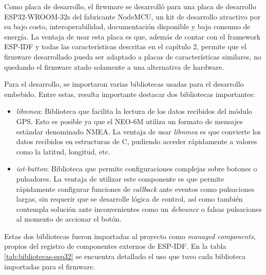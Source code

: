 Como placa de desarrollo, el firwmare se desarrolló para una placa de desarrollo ESP32-WROOM-32s del fabricante NodeMCU, un kit de desarrollo atractivo por su bajo costo, interoperabilidad, documentación disponible y bajo consumo de energía. La ventaja de usar esta placa es que, además de contar con el framework ESP-IDF y todas las características descritas en el capítulo 2, permite que el firmware desarrollado pueda ser adaptado a placas de características similares, no quedando el firmware atado solamente a una alternativa de hardware.

Para el desarrollo, se importaron varias bibliotecas usadas para el desarrollo embebido. Entre estas, resulta importante destacar dos bibliotecas importantes:
\begin{itemize}
	\item \textit{libnmea}: Biblioteca que facilita la lectura de los datos recibidos del módulo GPS\citep{LIBNMEA:1}. Esto es posible ya que el NEO-6M utiliza un formato de mensajes estándar denominado NMEA\citep{NMEA:1}. La ventaja de usar \textit{libnmea} es que convierte los datos recibidos en estructuras de C, pudiendo acceder rápidamente a valores como la latitud, longitud, etc.
	\item \textit{iot-button}: Biblioteca que permite configuraciones complejas sobre botones o pulsadores\citep{BUTTON:1}. La ventaja de utilizar este componente es que permite rápidamente configurar funciones de \textit{callback} ante eventos como pulsaciones largas, sin requerir que se desarrolle lógica de control, así como también contempla solución ante inconvenientes como un \textit{debounce} o falsas pulsaciones al momento de accionar el botón\citep{DEBOUNCE:1}.
\end{itemize}

Estas dos bibliotecas fueron importadas al proyecto como \textit{managed components}, propios del registro de componentes externos de ESP-IDF\citep{ESPIDF:1}. En la tabla \ref{tab:bibliotecas-esp32} se encuentra detallado el uso que tuvo cada biblioteca importadas para el firmware.

